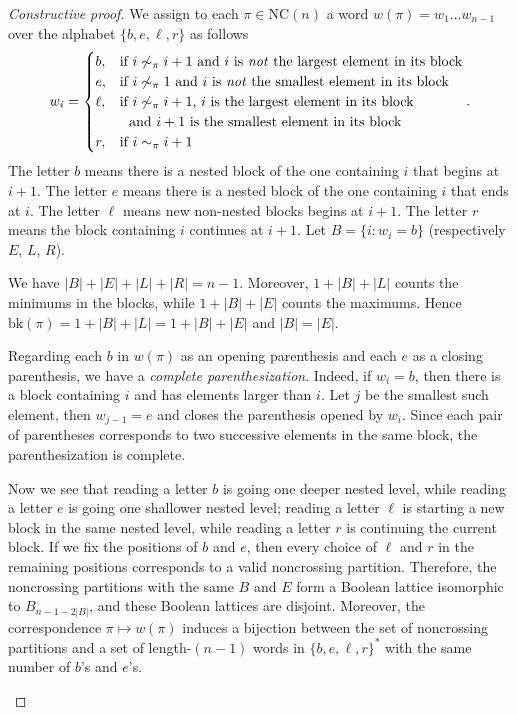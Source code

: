 \begin{proof}[Constructive proof]
  We assign to each $\pi\in\text{NC}(n)$ a word $w(\pi) = w_1\ldots w_{n-1}$ over the alphabet $\{b,e,\ell,r\}$ as follows
  $$w_i = \begin{cases}
      b,    & \text{if $i\not\sim_\pi i+1$ and $i$ is \textit{not} the largest element in its block} \\
      e,    & \text{if $i\not\sim_\pi 1$ and $i$ is \textit{not} the smallest element in its block}  \\
      \ell, & \text{if $i\not\sim_\pi i+1$, $i$ is the largest element in its block}                 \\
            & \text{\,\,\,\,and $i+1$ is the smallest element in its block}                          \\
      r,    & \text{if $i\sim_\pi i+1$}
    \end{cases}.$$
  The letter $b$ means there is a nested block of the one containing $i$ that begins at $i+1$. The letter $e$ means there is a nested block of the one containing $i$ that ends at $i$. The letter $\ell$ means new non-nested blocks begins at $i+1$.  The letter $r$ means the block containing $i$ continues at $i+1$.
  Let $B=\{i : w_i = b\}$ (respectively $E$, $L$, $R$).

  \begin{observation}
    \label{obs:b=e}
    We have $|B|+|E|+|L|+|R|=n-1$. Moreover, $1+|B|+|L|$ counts the minimums in the blocks, while $1+|B|+|E|$ counts the maximums. Hence $\text{bk}(\pi) = 1+|B|+|L|=1+|B|+|E|$ and $|B| = |E|$.
  \end{observation}

  \begin{observation}
    Regarding each $b$ in $w(\pi)$ as an opening parenthesis and each $e$ as a closing parenthesis, we have a \textit{complete parenthesization}. Indeed, if $w_i=b$, then there is a block containing $i$ and has elements larger than $i$. Let $j$ be the smallest such element, then $w_{j-1}=e$ and closes the parenthesis opened by $w_i$. Since each pair of parentheses corresponds to two successive elements in the same block, the parenthesization is complete.
  \end{observation}

  \begin{observation}
    \label{obs:boolean}
    Now we see that reading a letter $b$ is going one deeper nested level, while reading a letter $e$ is going one shallower nested level; reading a letter $\ell$ is starting a new block in the same nested level, while reading a letter $r$ is continuing the current block. If we fix the positions of $b$ and $e$, then every choice of $\ell$ and $r$ in the remaining positions corresponds to a valid noncrossing partition. Therefore, the noncrossing partitions with the same $B$ and $E$ form a Boolean lattice isomorphic to $B_{n-1-2|B|}$, and these Boolean lattices are disjoint. Moreover, the correspondence $\pi\mapsto w(\pi)$ induces a bijection between the set of noncrossing partitions and a set of length-$(n-1)$ words in $\{b,e,\ell,r\}^*$ with the same number of $b$'s and $e$'s.
  \end{observation}


\end{proof}
